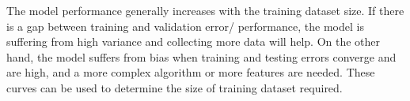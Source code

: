 \documentclass[preprint,1p,times,authoryear]{elsarticle}%
\begin{document}
The model performance generally increases with the training dataset size. If there is a gap between training and validation error/ performance, the model is suffering from high variance and collecting more data will help. On the other hand, the model suffers from bias when training and testing errors converge and are high, and a more complex algorithm or more features are needed. These curves can be used to determine the size of training dataset required.  %
\end{document}
